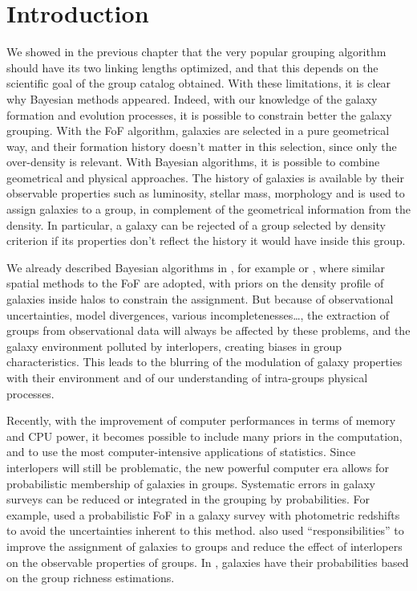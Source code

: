 \section{Introduction}
\label{sec:maggie_introduction}

\newcommand\rvir{r_{\rm vir}}
\newcommand\vvir{v_{\rm vir}}
\newcommand\mvir{M_{\rm vir}}
\newcommand\pps{\emph{pps}}

We showed in the previous chapter that the very popular grouping algorithm
should have its two linking lengths optimized, and that this depends on the
scientific goal of the group catalog obtained. With these limitations, it is
clear why Bayesian methods appeared. Indeed, with our knowledge of the galaxy
formation and evolution processes, it is possible to constrain better the
galaxy grouping. With the FoF algorithm, galaxies are selected in a pure
geometrical way, and their formation history doesn't matter in this selection,
since only the over-density is relevant. With Bayesian algorithms, it is
possible to combine geometrical and physical approaches. The history of
galaxies is available by their observable properties such as luminosity,
stellar mass, morphology and is used to assign galaxies to a group, in
complement of the geometrical information from the density. In particular, a
galaxy can be rejected of a group selected by density criterion if its
properties don't reflect the history it would have inside this group.

We already described Bayesian algorithms in
, for example \citet{Yang+07} or
\citet{DominguezRomero+12}, where similar spatial methods to the FoF are
adopted, with priors on the density profile of galaxies inside halos to
constrain the assignment. But because of observational uncertainties, model
divergences, various incompletenesses\ldots, the extraction of groups from
observational data will always be affected by these problems, and the galaxy
environment polluted by interlopers, creating biases in group characteristics.
This leads to the blurring of the modulation of galaxy properties with their
environment and of our understanding of intra-groups physical processes.

Recently, with the improvement of computer performances in terms of memory and
CPU power, it becomes possible to include many priors in the computation, and
to use the most computer-intensive applications of statistics. Since
interlopers will still be problematic, the new powerful computer era allows for
probabilistic membership of galaxies in groups. Systematic errors in galaxy
surveys can be reduced or integrated in the grouping by probabilities. For
example, \citet{Liu+08} used a probabilistic FoF in a galaxy survey with
photometric redshifts to avoid the uncertainties inherent to this method.
\citet{DominguezRomero+12} also used ``responsibilities'' to improve the
assignment of galaxies to groups and reduce the effect of interlopers on the
observable properties of groups. In \citet{Rykoff+14}, galaxies have their
probabilities based on the group richness estimations.

